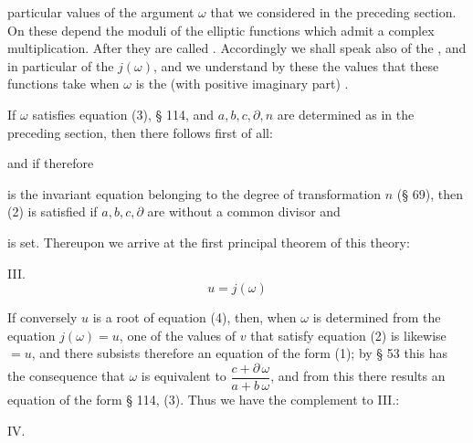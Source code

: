 particular values of the argument $\omega$ that we considered in the preceding section. On these depend the moduli of the elliptic functions which admit a complex multiplication. After  they are called . Accordingly we shall speak also of the , and in particular of the  $j(\omega)$, and we understand by these the values that these functions take when $\omega$ is the  (with positive imaginary part) .

If $\omega$ satisfies equation (3), § 114, and $a, b, c, \partial, n$ are determined as in the preceding section, then there follows first of all:


and if therefore


is the invariant equation belonging to the degree of transformation $n$ (§ 69), then (2) is satisfied if $a, b, c, \partial$ are without a common divisor and


is set. Thereupon we arrive at the first principal theorem of this theory:

III. 
\[
u = j(\omega)
\]


If conversely $u$ is a root of equation (4), then, when $\omega$ is determined from the equation $j(\omega) = u$, one of the values of $v$ that satisfy equation (2) is likewise $= u$, and there subsists therefore an equation of the form (1); by § 53 this has the consequence that $\omega$ is equivalent to $\dfrac{c + \partial\,\omega}{a + b\,\omega}$, and from this there results an equation of the form § 114, (3). Thus we have the complement to III.:

IV. 
